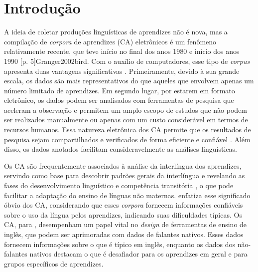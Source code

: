 \documentclass[portuguese]{textolivre}
\begin{document}
\begin{polyabstract}
\begin{english}
\begin{abstract}
\end{abstract}
\end{english}
\end{polyabstract}

\section{Introdução}\label{sec-intro}
A ideia de coletar produções linguísticas de aprendizes não é nova, mas a compilação de \textit{corpora} de aprendizes (CA) eletrônicos é um fenômeno relativamente recente, que teve início no final dos anos 1980 e início dos anos 1990 \cite[p. 128]{nesselhauf2004learner}[p. 5]{Granger2002bird}. Com o auxílio de computadores, esse tipo de \textit{corpus} apresenta duas vantagens significativas \parencite{granger_gilquin_meunier_2015}. Primeiramente, devido à sua grande escala, os dados são mais representativos do que aqueles que envolvem apenas um número limitado de aprendizes. Em segundo lugar, por estarem em formato eletrônico, os dados podem ser analisados com ferramentas de pesquisa que aceleram a observação e permitem um amplo escopo de estudos que não podem ser realizados manualmente ou apenas com um custo considerável em termos de recursos humanos. Essa natureza eletrônica dos CA permite que os resultados de pesquisa sejam compartilhados e verificados de forma eficiente e confiável \parencite[p. 130]{nesselhauf2004learner}. Além disso, os dados anotados facilitam consideravelmente as análises linguísticas.

Os CA são frequentemente associados à análise da interlíngua dos aprendizes, servindo como base para descobrir padrões gerais da interlíngua \cite{cobb2013,nesselhauf2004learner,santos2016corpus} e revelando as fases do desenvolvimento linguístico e competência transitória \parencite{selinker1992rediscovering}, o que pode facilitar a adaptação do ensino de línguas não maternas. \textcite{rundell1996corpus} enfatiza esse significado óbvio dos CA, considerando que esses \textit{corpora} fornecem informações confiáveis sobre o uso da língua pelos aprendizes, indicando suas dificuldades típicas. Os CA, para \textcite{granger1998}, desempenham um papel vital no \textit{design} de ferramentas de ensino de inglês, que podem ser aprimoradas com dados de falantes nativos. Esses dados fornecem informações sobre o que é típico em inglês, enquanto os dados dos não-falantes nativos destacam o que é desafiador para os aprendizes em geral e para grupos específicos de aprendizes.
\end{document}
